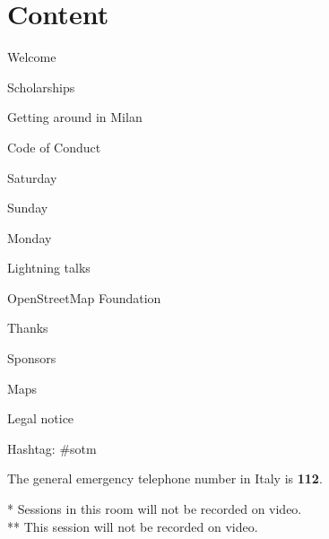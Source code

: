 \section*{Content}

\vspace*{0.35em}%
\noindent Welcome\dotfill \pageref{welcome}

\vspace*{0.35em}%
\noindent Scholarships \dotfill \pageref{scholarships}

\vspace*{0.35em}%
\noindent Getting around in Milan \dotfill \pageref{getting-around}

\vspace*{0.35em}%
\noindent Code of Conduct \dotfill \pageref{coc}

\vspace*{0.35em}%
\noindent Saturday \dotfill \pageref{saturday}

\vspace*{0.35em}%
\noindent Sunday \dotfill \pageref{sunday}

\vspace*{0.35em}%
\noindent Monday \dotfill \pageref{monday}

\vspace*{0.35em}%
\noindent Lightning talks \dotfill \pageref{lightning-talks}

\vspace*{0.35em}%
\noindent OpenStreetMap Foundation \dotfill \pageref{osmf}

\vspace*{0.35em}%
\noindent Thanks \dotfill \pageref{thanks}

\vspace*{0.35em}%
\noindent Sponsors \dotfill \pageref{sponsors}

\vspace*{0.35em}%
\noindent Maps \dotfill \pageref{maps}

\vspace*{0.35em}%
\noindent Legal notice \dotfill \pageref{legal}

\vfill
\noindent
Hashtag: \#sotm

\vspace*{0.8em}%
\noindent
The general emergency telephone number in Italy is \textbf{112}.
\vfill

\small{
\noindent
  \** Sessions in this room will not be recorded on video.\\
  \**\** This session will not be recorded on video.
}\normalsize


\newpage
